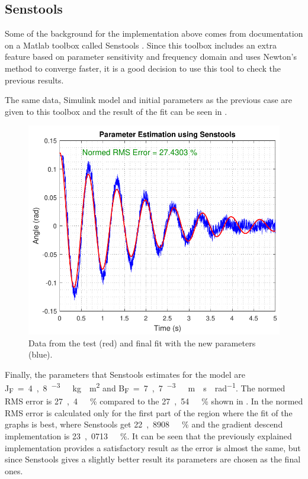 \subsection{Senstools}
Some of the background for the implementation above comes from documentation on a Matlab toolbox called Senstools \cite{Senstools}. Since this toolbox includes an extra feature based on parameter sensitivity and frequency domain and uses Newton's method to converge faster, it is a good decision to use this tool to check the previous results.

The same data, Simulink model and initial parameters as the previous case are given to this toolbox and the result of the fit can be seen in . 
%
\begin{figure}[H]
	\centering
	\includegraphics[scale=0.6]{figures/SenseToolParameterEstimation}
	\caption{Data from the test (red) and final fit with the new parameters (blue).}
	\label{SenseToolParameterEstimation}
\end{figure}

Finally, the parameters that Senstools estimates for the model are \si{J_F=4,8 ^{-3}\ kg \cdot m^2} and \si{B_F=7,7 ^{-3}\ m \cdot s \cdot rad^{-1}}. The normed RMS error is \si{27,4\ \%} compared to the \si{27,54\ \%} shown in . In  the normed RMS error is calculated only for the first part of the region where the fit of the graphs is best, where Senstools get \si{22,8908\ \%} and the gradient descend implementation is \si{23,0713\ \%}. It can be seen that the previously explained implementation provides a satisfactory result as the error is almost the same, but since Senstools gives a slightly better result its parameters are chosen as the final ones.

